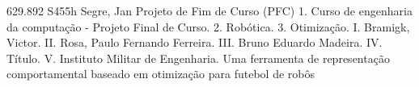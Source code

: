 \documentclass[
  12pt,				%
  oneside,			%
  a4paper,			%
  english,			%
  brazil,				%
  sumario=tradicional,
]{ime-abntex2}
\begin{document}


\imprimircapa
%

\imprimirfolhaderosto*
%


%
%     
\imprimirfichacatalografica
{629.892}
{S455h}
{Segre, Jan}
{Projeto de Fim de Curso (PFC)}
{%
  1. Curso de engenharia da computação - Projeto Final de Curso.
  2. Robótica.
  3. Otimização.
  I. Bramigk, Victor.
  II. Rosa, Paulo Fernando Ferreira.
  III. Bruno Eduardo Madeira.
  IV. Título.
  V. Instituto Militar de Engenharia.
}
{Uma ferramenta de representação comportamental baseado em otimização
para futebol de robôs}

%
%
%
%
\end{document}

